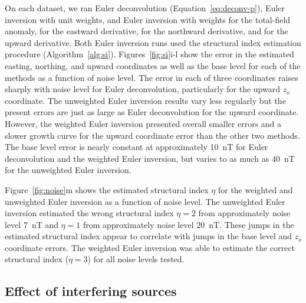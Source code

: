 On each dataset, we ran Euler deconvolution (Equation~\ref{eq:deconv-p}), Euler inversion with unit weights, and Euler inversion with weights \SynNoiseWeightsF{} for the total-field anomaly, \SynNoiseWeightsE{} for the eastward derivative, \SynNoiseWeightsN{} for the northward derivative, and \SynNoiseWeightsU{} for the upward derivative.
Both Euler inversion runs used the structural index estimation procedure (Algorithm~\ref{alg:si}).
Figures~\ref{fig:si}i-l show the error in the estimated easting, northing, and upward coordinates as well as the base level for each of the methods as a function of noise level.
The error in each of three coordinates raises sharply with noise level for Euler deconvolution, particularly for the upward $z_o$ coordinate.
The unweighted Euler inversion results vary less regularly but the present errors are just as large as Euler deconvolution for the upward coordinate.
However, the weighted Euler inversion presented overall smaller errors and a slower growth curve for the upward coordinate error than the other two methods.
The base level error is nearly constant at approximately \qty{10}{\nano\tesla} for Euler deconvolution and the weighted Euler inversion, but varies to as much as \qty{40}{\nano\tesla} for the unweighted Euler inversion.

Figure~\ref{fig:noise}m shows the estimated structural index $\eta$ for the weighted and unweighted Euler inversion as a function of noise level.
The unweighted Euler inversion estimated the wrong structural index $\eta=2$ from approximately noise level \qty{7}{\nano\tesla} and $\eta=1$ from approximately noise level \qty{20}{\nano\tesla}.
These jumps in the estimated structural index appear to correlate with jumps in the base level and $z_o$ coordinate errors.
The weighted Euler inversion was able to estimate the correct structural index ($\eta=3$) for all noise levels tested.


\subsection{Effect of interfering sources}
\label{sec:interf}

